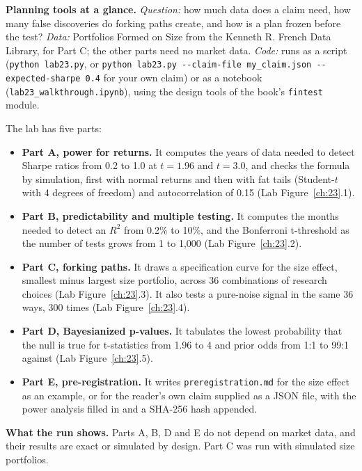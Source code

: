 \begin{callout}
\textbf{Planning tools at a glance.} \emph{Question:} how much data does a claim need, how many false discoveries do forking paths create, and how is a plan frozen before the test? \emph{Data:} Portfolios Formed on Size from the Kenneth R. French Data Library, for Part C; the other parts need no market data. \emph{Code:} runs as a script (\texttt{python lab23.py}, or \texttt{python lab23.py -{}-claim-file my\_claim.json -{}-expected-sharpe 0.4} for your own claim) or as a notebook (\texttt{lab23\_walkthrough.ipynb}), using the design tools of the book's \texttt{fintest} module.
\end{callout}

The lab has five parts:

\begin{itemize}
  \item \textbf{Part A, power for returns.} It computes the years of data needed to detect Sharpe ratios from 0.2 to 1.0 at $t = 1.96$ and $t = 3.0$, and checks the formula by simulation, first with normal returns and then with fat tails (Student-$t$ with 4 degrees of freedom) and autocorrelation of 0.15 (Lab Figure~\ref{ch:23}.1).
  \item \textbf{Part B, predictability and multiple testing.} It computes the months needed to detect an $R^2$ from 0.2\% to 10\%, and the Bonferroni t-threshold as the number of tests grows from 1 to 1,000 (Lab Figure~\ref{ch:23}.2).
  \item \textbf{Part C, forking paths.} It draws a specification curve for the size effect, smallest minus largest size portfolio, across 36 combinations of research choices (Lab Figure~\ref{ch:23}.3). It also tests a pure-noise signal in the same 36 ways, 300 times (Lab Figure~\ref{ch:23}.4).
  \item \textbf{Part D, Bayesianized p-values.} It tabulates the lowest probability that the null is true for t-statistics from 1.96 to 4 and prior odds from 1:1 to 99:1 against (Lab Figure~\ref{ch:23}.5).
  \item \textbf{Part E, pre-registration.} It writes \texttt{preregistration.md} for the size effect as an example, or for the reader's own claim supplied as a JSON file, with the power analysis filled in and a SHA-256 hash appended.
\end{itemize}

\textbf{What the run shows.} Parts A, B, D and E do not depend on market data, and their results are exact or simulated by design. Part C was run with simulated size portfolios.

